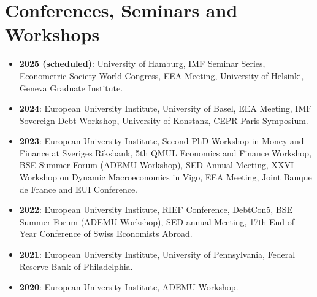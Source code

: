\documentclass[letterpaper,11pt]{article}
\makeatletter
\newcommand{\resumeItem}[2]{
  \item\small{
    \textbf{#1}{: #2 \vspace{-2pt}}
  }
}
\newcommand{\resumeSubheading}[4]{
  \vspace{-1pt}\item
    \begin{tabular*}{0.97\textwidth}{l@{\extracolsep{\fill}}r}
      \textbf{#1} & #2 \\
      \textit{\small#3} & \textit{\small #4} \\
    \end{tabular*}\vspace{-5pt}
}
\newcommand{\resumeSubItem}[2]{\resumeItem{#1}{#2}\vspace{-1pt}}
\newcommand{\resumeSubHeadingListStart}{\begin{itemize}[leftmargin=*]}
\newcommand{\resumeSubHeadingListEnd}{\end{itemize}}
\makeatother
\begin{document}
%  
%      

\section{Conferences, Seminars and Workshops}
\resumeSubHeadingListStart
\resumeSubItem{2025 (scheduled)}{University of Hamburg, IMF Seminar Series, Econometric Society World Congress, EEA Meeting, University of Helsinki, Geneva Graduate Institute.}
\resumeSubItem{2024}{European University Institute, University of Basel, EEA Meeting, IMF Sovereign Debt Workshop, University of Konstanz, CEPR Paris Symposium.}
\resumeSubItem{2023}{European University Institute, Second PhD Workshop in Money and Finance at Sveriges Riksbank, 5th QMUL Economics and Finance Workshop, BSE Summer Forum (ADEMU Workshop), SED Annual Meeting, XXVI Workshop on Dynamic Macroeconomics in Vigo, EEA Meeting, Joint Banque de France and EUI Conference.}
\resumeSubItem{2022}{European University Institute, RIEF Conference, DebtCon5, BSE Summer Forum (ADEMU Workshop), SED annual Meeting, 17th End-of-Year Conference of Swiss Economists Abroad.}
\resumeSubItem{2021}{European University Institute, University of Pennsylvania, Federal Reserve Bank of Philadelphia.}
\resumeSubItem{2020}{European University Institute, ADEMU Workshop.}
\resumeSubHeadingListEnd
\end{document}

